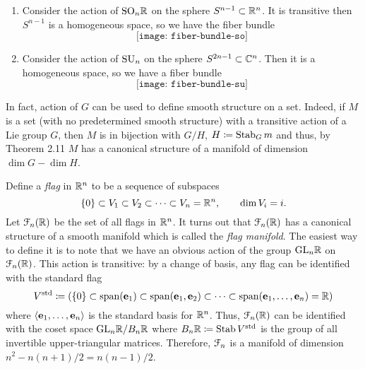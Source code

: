 \begin{enumerate}[label=(\arabic*)]
\item Consider the action of $\mathrm{SO}_n\mathbb{R}$ on the sphere
  $S^{n-1}\subset\mathbb{R}^n$. It is transitive then $S^{n-1}$ is a homogeneous
  space, so we have the fiber bundle
  \[
    \texttt{[image: fiber-bundle-so]}
  \]
\item Consider the action of $\mathrm{SU}_n$ on the sphere
  $S^{2n-1}\subset\mathbb{C}^n$. Then it is a homogeneous space, so we have a
  fiber bundle
  \[
    \texttt{[image: fiber-bundle-su]}
  \]
\end{enumerate}

In fact, action of $G$ can be used to define smooth structure on a
set. Indeed, if $M$ is a set (with no predetermined smooth structure) with
a transitive action of a Lie group $G$, then $M$ is in bijection with
$G/H$, $H\coloneq\operatorname{Stab}_G m$ and thus, by Theorem 2.11 $M$ has a canonical
structure of a manifold of dimension $\dim G-\dim H$.

\begin{example}
  Define a \emph{flag} in $\mathbb{R}^n$ to be a sequence of subspaces
  \[
    \{0\}\subset V_1\subset V_2\subset\dotsb\subset V_n=\mathbb{R}^n,\qquad \dim
    V_i=i.
  \]
  Let $\mathcal{F}_n(\mathbb{R})$ be the set of all flags in $\mathbb{R}^n$. It turns out
  that $\mathcal{F}_n(\mathbb{R})$ has a canonical structure of a smooth manifold which
  is called the \emph{flag manifold}. The easiest way to define it is to
  note that we have an obvious action of the group $\mathrm{GL}_n\mathbb{R}$ on
  $\mathcal{F}_n(\mathbb{R})$. This action is transitive: by a change of basis, any flag
  can be identified with the standard flag
  \[
    V^{\text{std}}\coloneq\left( \{0\}\subset\operatorname{span}(\mathbf{e}_1
      )\subset\operatorname{span}(\mathbf{e}_1,\mathbf{e}_2
      )\subset\cdots\subset\operatorname{span}(\mathbf{e}_1,\dotsc,\mathbf{e}_n )=\mathbb{R}\right)
  \]
  where $\langle \mathbf{e}_1,\dots,\mathbf{e}_n \rangle$ is the standard basis for
  $\mathbb{R}^n$. Thus, $\mathcal{F}_n(\mathbb{R})$ can be identified with the coset space
  $\mathrm{GL}_n\mathbb{R}/B_n\mathbb{R}$ where $B_n\mathbb{R}\coloneq\operatorname{Stab} V^{\text{std}}$ is the
  group of all invertible upper-triangular matrices. Therefore, $\mathcal{F}_n$
  is a manifold of  dimension $n^2-n(n+1)/2=n(n-1)/2$.
\end{example}

